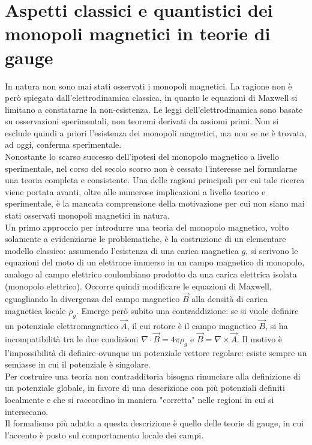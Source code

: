 



\chapter*{
   Aspetti classici e quantistici dei monopoli magnetici in teorie di gauge
}


In natura non sono mai stati osservati i monopoli magnetici. La ragione non è però
spiegata dall'elettrodinamica classica, in quanto le equazioni di Maxwell
si limitano a constatarne la non-esistenza. Le leggi dell'elettrodinamica
sono basate su osservazioni sperimentali, non teoremi derivati da assiomi primi.
Non si esclude quindi a priori l'esistenza dei monopoli magnetici, ma non se ne
è trovata, ad oggi, conferma sperimentale. \\
Nonostante lo scarso successo dell'ipotesi del monopolo magnetico a livello sperimentale,
nel corso del secolo scorso non è cessato l'interesse nel formularne una teoria
completa e consistente. Una delle ragioni principali per cui tale ricerca viene
portata avanti, oltre alle numerose implicazioni a livello
teorico e sperimentale, è la mancata comprensione della motivazione
per cui non siano mai stati osservati monopoli magnetici in natura.\\

Un primo approccio per introdurre una teoria del monopolo magnetico, volto solamente
a evidenziarne le problematiche, è la costruzione di un elementare modello classico:
assumendo l'esistenza di una carica magnetica $g$, si scrivono le equazioni del moto
di un elettrone immerso in un campo magnetico di monopolo, analogo al campo elettrico
coulombiano prodotto da una carica elettrica isolata
(monopolo elettrico). Occorre quindi modificare le equazioni di Maxwell,
eguagliando la divergenza del campo magnetico $\vec B$ alla densità di carica magnetica
locale $\rho_g$.
Emerge però subito una contraddizione: se si vuole definire
un potenziale elettromagnetico $\vec A$, il cui rotore è il campo magnetico $\vec B$,
si ha incompatibilità tra le due condizioni $\nabla \cdot \vec B = 4 \pi\rho_g$ e
$\vec B = \nabla \times \vec A$. Il motivo è l'impossibilità di definire ovunque un
potenziale vettore regolare: esiste sempre un semiasse in cui il potenziale è singolare.\\

Per costruire una teoria non contradditoria bisogna rinunciare alla definizione
di un potenziale globale, in favore di una descrizione con più potenziali definiti
localmente e che si raccordino in maniera "corretta" nelle regioni in cui si intersecano.\\
Il formalismo più adatto a questa descrizione è quello delle teorie di gauge, in
cui l'accento è posto sul comportamento locale dei campi.\\

